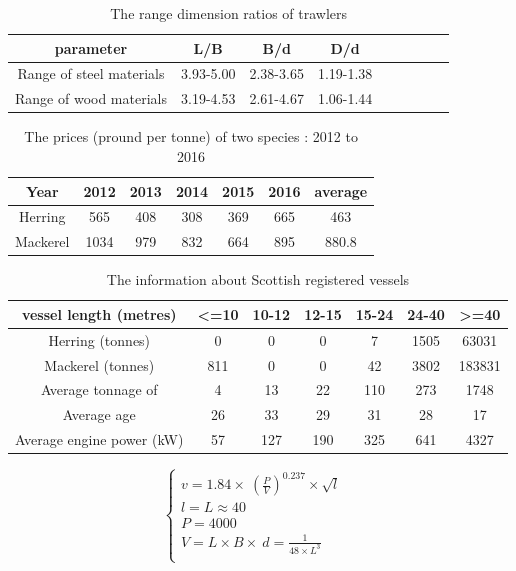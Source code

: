 \documentclass{mcmthesis}
\begin{document}
\begin{table}[!htb]
\centering
\setlength{\abovecaptionskip}{0pt}%
\setlength{\belowcaptionskip}{15pt}%
\caption{The range dimension ratios of  trawlers}
\begin{tabular}{ccccccccc}
\toprule[1.5pt]
parameter &L/B&B/d&D/d\\
\toprule[1.5pt]
Range of steel materials&3.93-5.00&2.38-3.65&1.19-1.38\\
Range of wood materials&3.19-4.53&2.61-4.67&1.06-1.44\\
\bottomrule[1.5pt]
\end{tabular}
\end{table}

\begin{table}[!htb]
\centering
\setlength{\abovecaptionskip}{0pt}%
\setlength{\belowcaptionskip}{13pt}%
\caption{The prices (pround  per tonne) of two species : 2012 to 2016}
\begin{tabular}{ccccccc}
\toprule[1.5pt]
Year&2012&2013&2014&2015&2016&average\\
\bottomrule[1.5pt]
Herring &565&408&308&369&665&463\\
Mackerel &1034&979&832&664&895&880.8\\
\bottomrule[1.5pt]
\end{tabular}
\end{table}


\begin{table}[!htb]
\centering
\setlength{\abovecaptionskip}{0pt}%
\setlength{\belowcaptionskip}{13pt}%
\caption{The information about Scottish registered vessels}
\begin{tabular}{ccccccc}
\toprule[1.5pt]
vessel length (metres)&<=10&10-12&12-15&15-24&24-40&>=40\\
\bottomrule[1.5pt]
Herring (tonnes)&0&0&0&7&1505&63031\\
Mackerel (tonnes) &811&0&0&42&3802&183831\\
Average tonnage of &4&13&22&110&273&1748\\
Average age&26&33&29&31&28&17\\
Average engine power (kW)&57&127&190&325&641&4327\\

\bottomrule[1.5pt]
\end{tabular}
\end{table}

\begin{equation}
\left\{
\begin{array}{lr}
v=1.84\times \ (\frac{P}{V}) ^{0.237} \times \sqrt{l} &\\
l=L\approx 40 &\\
P=4000&\\
V=L\times B\times\ d =\frac{1}{48\times L^3}\\
\end{array}
\right.
\end{equation}
\end{document}
